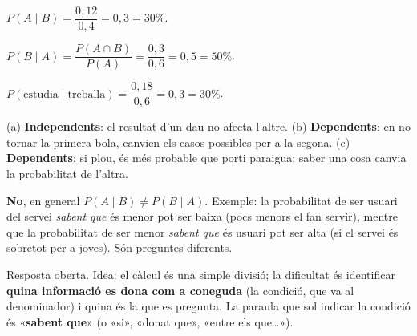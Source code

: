 \begin{solucions}
\begin{sollist}
  \item $P(A\mid B)=\dfrac{0,12}{0,4}=0,3=30\%$.
  \item $P(B\mid A)=\dfrac{P(A\cap B)}{P(A)}=\dfrac{0,3}{0,6}=0,5=50\%$.
  \item $P(\text{estudia}\mid\text{treballa})=\dfrac{0,18}{0,6}=0,3=30\%$.
  \item (a) \textbf{Independents}: el resultat d'un dau no afecta l'altre. \quad
        (b) \textbf{Dependents}: en no tornar la primera bola, canvien els casos
        possibles per a la segona. \quad (c) \textbf{Dependents}: si plou, és més
        probable que porti paraigua; saber una cosa canvia la probabilitat de l'altra.
  \item \textbf{No}, en general $P(A\mid B)\neq P(B\mid A)$. Exemple: la probabilitat de
        ser usuari del servei \emph{sabent que} és menor pot ser baixa (pocs menors el
        fan servir), mentre que la probabilitat de ser menor \emph{sabent que} és
        usuari pot ser alta (si el servei és sobretot per a joves). Són preguntes
        diferents.
  \item Resposta oberta. Idea: el càlcul és una simple divisió; la dificultat és
        identificar \textbf{quina informació es dona com a coneguda} (la condició, que
        va al denominador) i quina és la que es pregunta. La paraula que sol indicar la
        condició és «\textbf{sabent que}» (o «si», «donat que», «entre els que\dots»).
\end{sollist}
\end{solucions}
